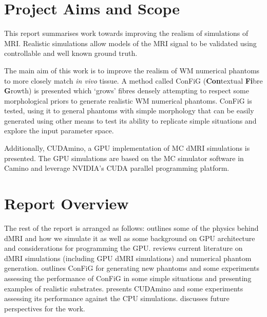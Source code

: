 \section{Project Aims and Scope}
\label{sec:intro_project_aims}
This report summarises work towards improving the realism of simulations of \ac{MRI}. Realistic simulations allow models of the MRI signal to be validated using controllable and well known ground truth.

The main aim of this work is to improve the realism of \ac{WM} numerical phantoms to more closely match \emph{in vivo} tissue.
A method called \acs{ConFiG} (\textbf{Con}textual \textbf{Fi}bre \textbf{G}rowth) is presented which `grows' fibres densely attempting to respect some morphological priors to generate realistic \ac{WM} numerical phantoms.
\ac{ConFiG} is tested, using it to general phantoms with simple morphology that can be easily generated using other means to test its ability to replicate simple situations and explore the input parameter space.


Additionally, CUDAmino, a \ac{GPU} implementation of \ac{MC} \ac{dMRI} simulations is presented. The \ac{GPU} simulations are based on the \ac{MC} simulator software in Camino\cite{Cook2006,Hall2009} and leverage NVIDIA's \acs{CUDA} parallel programming platform. 




\section{Report Overview}
\label{sec:intro_report_overview}
The rest of the report is arranged as follows:  outlines some of the physics behind \acl{dMRI} and how we simulate it as well as some background on \ac{GPU} architecture and considerations for programming the \ac{GPU}.  reviews current literature on \ac{dMRI} simulations (including \ac{GPU} \ac{dMRI} simulations) and numerical phantom generation.  outlines \ac{ConFiG} for generating new phantoms and some experiments assessing the performance of \ac{ConFiG} in some simple situations and presenting examples of realistic substrates.  presents CUDAmino and some experiments assessing its performance against the \ac{CPU} simulations.  discusses future perspectives for the work.



